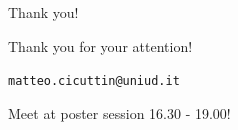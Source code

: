 \documentclass{beamer}
\begin{document}
\begin{frame}{Thank you!}
    \begin{center}
        {\LARGE Thank you for your attention!}

        \vspace{1cm}
        \texttt{matteo.cicuttin@uniud.it}

        \vspace{1cm}
        {\Large Meet at poster session 16.30 - 19.00!}
    \end{center}
\end{frame}
\end{document}
